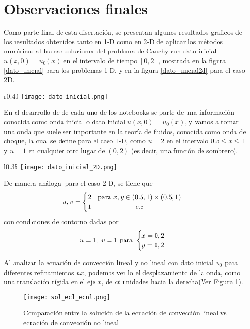 \documentclass[A4,11pt]{article}
\begin{document}
\section{Observaciones finales}
Como parte final de esta disertación, se presentan algunos resultados gráficos de los resultados obtenidos tanto en 1-D como en 2-D de aplicar los métodos numéricos al buscar soluciones del problema de Cauchy con dato inicial $u(x,0)=u_0(x)$ en el intervalo de tiempo $[0,2]$, mostrada en la figura \ref{dato_inicial} para los problemas 1-D, y en la figura \ref{dato_inicial2d} para el caso 2D.\\

\begin{wrapfigure}{r}{0.40\textwidth} %
	\centering
	\texttt{[image: dato\_inicial.png]}
	\caption[]{$u_0(x)$ en 2-D}
		\label{dato_inicial}
\end{wrapfigure}
En el desarrollo de de cada uno de los notebooks se parte de una información conocida como onda inicial o dato inicial $u(x,0)=u_0(x)$, y vamos a tomar una onda que suele ser importante en la teoría de fluidos, conocida como onda de choque, la cual se define para el caso 1-D, como $ u = 2 $ en el intervalo $ 0.5 \leq x \leq 1 $ y $ u = 1 $ en cualquier otro lugar de $ (0,2) $ (es decir, una función de sombrero). \\

\begin{wrapfigure}{l}{0.35\textwidth} %
	\centering
	\texttt{[image: dato\_inicial\_2D.png]}
	\caption[]{ $u_0(x)$ en 2-D}
	\label{dato_inicial2d}
\end{wrapfigure}
De manera análoga, para el caso 2-D, se tiene que
$$u, v = \begin{cases}\begin{matrix}
		2 & \text{para } x,y \in (0.5, 1)\times(0.5,1) \cr
		1 & \text{c.c}
\end{matrix}\end{cases}$$
 con condiciones de contorno dadas por 
 $$u = 1,\ v = 1 \text{ para } \begin{cases} \begin{matrix}x=0,2\cr y=0,2 \end{matrix}\end{cases}$$

 Al analizar la ecuación de convección lineal y no lineal con dato inicial $u_0$ para diferentes refinamientos $nx$, podemos ver lo el desplazamiento de la onda, como una translación rígida en el eje $x$, de $ct$ unidades hacia la derecha(Ver Figura \ref{sol_ecl}).
\begin{figure}[h]
	\centering
	\texttt{[image: sol\_ecl\_ecnl.png]}
	\caption{Comparación entre la solución de la ecuación de convección lineal vs ecuación de convección no lineal}
	\label{sol_ecl}
\end{figure}
\end{document}
